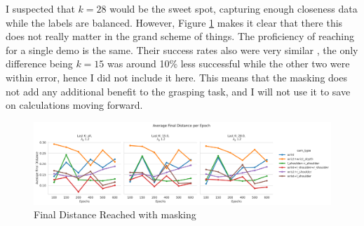 I suspected that \(k = 28\) would be the sweet spot, capturing enough closeness data while the labels are balanced. However, Figure \ref{fig:grasp-last-k-final} makes it clear that there this does not really matter in the grand scheme of things. The proficiency of reaching for a single demo is the same. Their success rates also were very similar , the only difference being $k = 15$ was around 10\% less successful while the other two were within error, hence I did not include it here. This means that the masking does not add any additional benefit to the grasping task, and I will not use it to save on calculations moving forward.

\begin{figure}[htpb]
  \centering
  \includegraphics[width=\linewidth]{assets/cam-comb/grasp-simple/last-k-dist.png}
  \caption{Final Distance Reached with masking}\label{fig:grasp-last-k-final}
\end{figure}
